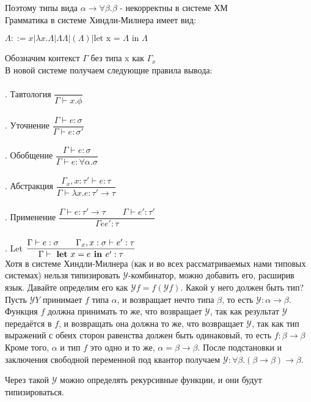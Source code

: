 	 \noindent Поэтому типы вида $\alpha\rightarrow\forall\beta.\beta$ - некорректны в системе ХМ\\
	 
	 \noindent Грамматика в системе Хиндли-Милнера имеет вид:\\
	 
	 \begin{center}
	 $\Lambda::=x | \lambda x.\Lambda | \Lambda\Lambda | (\Lambda) | \text{let x = }\Lambda \text{ in }\Lambda $ 
	 \end{center}
 		
 	 \noindent Обозначим контекст $\Gamma$ без типа x как $\Gamma_x$\\
 	 В новой системе получаем следующие правила вывода: \\ \\
 	 
 	 . Тавтология $\dfrac{}{\Gamma\vdash x.\phi}$ \\\\
 	
 	 . Уточнение $\dfrac{\Gamma\vdash e:\sigma}{\Gamma\vdash e:\sigma'}$ \\\\
 	 
 	 . Обобщение $\dfrac{\Gamma\vdash e:\sigma}{\Gamma\vdash e:\forall\alpha.\sigma}$ \\ \\
 	 . Абстракция $\dfrac{\Gamma_x, x:\tau'\vdash e:\tau}{\Gamma\vdash \lambda x.e:\tau'\rightarrow\tau}$ \\ \\
 	 . Применение $\dfrac{\Gamma\vdash e:\tau'\rightarrow\tau\qquad\Gamma\vdash e':\tau'}{\Gamma ee':\tau}$ \\ \\
 	 . Let $\dfrac{\Gamma\vdash e:\sigma\qquad\Gamma_x,x:\sigma\vdash e':\tau}{\Gamma\vdash\text{ \textbf{let} } x = e \textbf{ in }e':\tau}$ \\
 	 
 	 Хотя в системе Хиндли-Милнера (как и во всех рассматриваемых нами типовых системах) нельзя типизировать $\mathcal{Y} $-комбинатор,
 	 можно добавить его, расширив язык.
 	 Давайте определим его как $\mathcal{Y} f = f \left(\mathcal{Y} f\right)$.
 	 Какой у него должен быть тип? Пусть $\mathcal{Y}Y$ принимает $f$ типа $\alpha$, и возвращает нечто типа $\beta$,
 	 то есть $\mathcal{Y}: \alpha\to\beta$.
 	 Функция $f$ должна принимать то же, что возвращает $\mathcal{Y}$, так как результат $\mathcal{Y}$ передаётся в $f$,
 	 и возвращать она должна то же, что возвращает $\mathcal{Y}$, так как тип выражений с обеих сторон равенства должен быть одинаковый,
 	 то есть $f : \beta\to\beta$
 	 Кроме того, $\alpha$ и тип $f$ это одно и то же, $\alpha=\beta\to\beta$.
 	 После подстановки и заключения свободной переменной под квантор получаем $\mathcal{Y} : \forall\beta.(\beta\to\beta)\to\beta$.
 	 
 	 Через такой $\mathcal{Y}$ можно определять рекурсивные функции, и они будут типизироваться.
 	 
 
 	 

